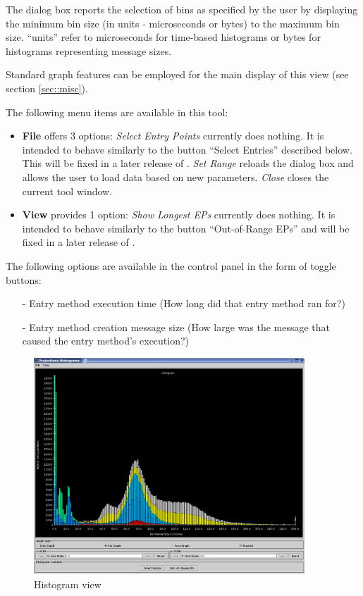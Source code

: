\documentclass[10pt]{article}
\begin{document}
The dialog box reports the selection of bins as specified by the user
by displaying the minimum bin size (in units - microseconds or bytes)
to the maximum bin size. ``units'' refer to microseconds for time-based
histograms or bytes for histograms representing message sizes.

Standard graph features can be employed for the main display of this
view (see section \ref{sec::misc}). 

The following menu items are available in this tool:

\begin{itemize}
\item {\bf File} offers 3 options: {\it Select Entry Points} currently
does nothing. It is intended to behave similarly to the button ``Select
Entries'' described below. This will be fixed in a later release of
\projections{}. {\it Set Range} reloads the dialog box and allows the
user to load data based on new parameters. {\it Close} closes the current
tool window.
\item {\bf View} provides 1 option: {\it Show Longest EPs} currently
does nothing. It is intended to behave similarly to the button 
``Out-of-Range EPs'' and will be fixed in a later release of \projections{}.
\end{itemize}

The following options are available in the control panel in the form
of toggle buttons:

\begin{itemize}
\item[-] Entry method execution time (How long did that entry method ran 
for?)
\item[-] Entry method creation message size (How large was the message
that caused the entry method's execution?)
\end{itemize}

\begin{figure}[htb]
\center
\includegraphics[width=4.0in]{fig/histogram}
\caption{Histogram view}
\label{histogram}
\end{figure}
\end{document}
